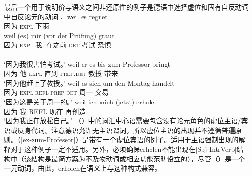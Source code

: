 \begin{exe}
\begin{xlist}[iv.]
\begin{exe}
\begin{xlist}[iv.]
最后一个用于说明价与语义之间非还原性的例子是德语中选择虚位和固有自反动词中自反论元的动词：
\eal
\ex 
\gll weil es regnet\\
     因为 \textsc{expl} 下雨\\
\ex 
\gll weil (es) mir (vor der Prüfung) graut\\
     因为 \textsc{expl} 我.\dat{} 在之前 \textsc{det} 考试 恐惧\\\\
\glt `因为我很害怕考试。'
\ex\label{ex-zum-Professor}
\gll weil er es bis zum Professor bringt\\
     因为 他 \textsc{expl} 直到 \textsc{prep}.\textsc{det} 教授 带来\\
\glt `因为他赶上了教授。'
\ex 
\gll weil es sich um den Montag handelt\\
     因为 \textsc{expl} \textsc{refl} \textsc{prep} \textsc{det} 周一 交易\\
\glt `因为这是关于周一的。'
\ex 
\gll weil ich mich (jetzt) erhole\\
     因为 我 REFL 现在 再创造\\
\glt `因为我正在放松自己。'
\zl
（）中的词汇中心语需要包含没有论元角色的虚位主语/宾语或反身代词。注意德语允许无主语谓词，所以虚位主语的出现并不遵循普遍原则。（\ref{ex-zum-Professor}）是带有一个虚位宾语的例子。适用于主语强制出现的解释对于这种例子一定不适用。另外，必须确保erholen不能出现在[Sbj IntrVerb]结构中（该结构是最简方案为不及物动词或相应功能范畴设立的），尽管（）是一个一元动词，由此，erholen在语义上与这种构式兼容。

\end{xlist}
\end{exe}
\end{xlist}
\end{exe}
